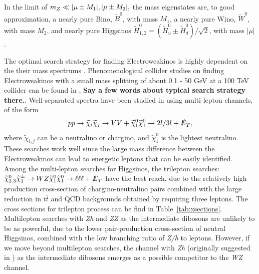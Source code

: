 \documentclass[a4paper,11pt]{article}
\newcommand{\Shufang}[1]{{\bf\color{Maroon}  #1}}
\renewcommand{\H}{\widetilde{H}^0}
\renewcommand{\B}{\widetilde{B}^0}
\newcommand{\met}{{\slashed{E}_T}}
\begin{document}
In the limit of $m_Z \ll |\mu\pm M_1|, |\mu\pm M_2|,$ the mass eigenstates
are, to good approximation, a nearly pure Bino, $\B$, with mass $M_1$,
a nearly pure Wino, $\widetilde{W}^0$, with mass $M_2$, and nearly pure Higgsinos
$\H_{1,2} = (\H_u \pm \H_d)/\sqrt{2}$, with mass
$|\mu|$. 

The optimal search strategy for finding Electroweakinos is highly dependent on
the their mass spectrums \citep{Han:2013kza}.   Phenomenological collider studies on finding
Electroweakinos with a small mass splitting of about 0.1 - 50 GeV at a 100 TeV collider can be
found in \citep{Low:2014cba, Bramante:2014tba, Berlin:2015aba, Cirelli:2014dsa},
\Shufang{Say a few words about typical search strategy there.}.
Well-separated spectra have been studied in \citep{Gori:2014oua,
Acharya:2014pua} using
multi-lepton channels, of the form 
\begin{equation}
pp\rightarrow \widetilde{\chi}_i\widetilde{\chi}_j\rightarrow VV +
\widetilde{\chi}_1^0\widetilde{\chi}_1^0\rightarrow 2l/3l +  
\met,
\end{equation}
\noindent where $\widetilde{\chi}_{i,j}$ can be a neutralino or chargino, and
$\widetilde{\chi}_1^0$ is the lightest neutralino. These searches work well since
the large mass difference between the Electroweakinos can lead to energetic
leptons that can be easily identified. Among the multi-lepton searches for
Higgsinos, the trilepton searches: $\widetilde\chi_{2,3}^0\widetilde\chi_1^\pm\rightarrow WZ\widetilde\chi_1^0\widetilde\chi_1^0\rightarrow \ell\ell\ell + \met$ have the best reach, due to the relatively high production cross-section of
chargino-neutralino pairs combined with the large reduction in $t\overline{t}$
and QCD backgrounds obtained by requiring three leptons.   The cross sections for trilepton process can be find in Table~\ref{tab:xsections}. Multilepton searches
with \emph{Zh} and \emph{ZZ} as the intermediate dibosons are unlikely to be as powerful,
due to the lower pair-production cross-section of neutral Higgsinos, combined
with the low branching ratio of \emph{Z/h} to leptons. However, if we move beyond
multilepton searches, the channel with \emph{Zh} (originally suggested in
\citep{Han:2013kza}) as the intermediate dibosons emerges as a possible
competitor to the \emph{WZ} channel.  
\end{document}
